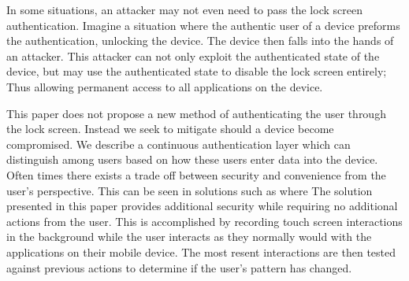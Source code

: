 In some situations,
an attacker may not even need to pass the lock screen authentication.
Imagine a situation where the authentic user of a device preforms the authentication,
unlocking the device.
The device then falls into the hands of an attacker.
This attacker can not only exploit the authenticated state of the device,
but may use the authenticated state to disable the lock screen entirely;
Thus allowing permanent access to all applications on the device.
%
\cite{harbach2014sa}

This paper does not propose a new method of
authenticating the user through the lock screen.
Instead we seek to mitigate should a
device become compromised.
We describe a continuous authentication
layer which can distinguish among users
based on how these users enter data into the device.
%
Often times there exists a trade off between
security and convenience from the user's perspective.
This can be seen in solutions such as
where
The solution presented in this paper
provides additional security while requiring
no additional actions from the user.
This is accomplished by
recording touch screen interactions
in the background while the
user interacts as they normally would
with the applications on their mobile device.
The most resent interactions are then
tested against previous actions
to determine if the user's
pattern has changed.

